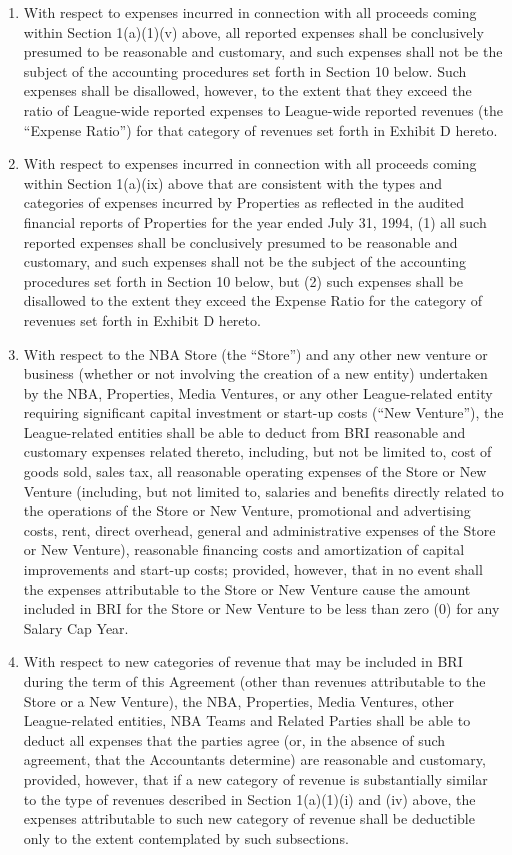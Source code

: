 \documentclass[
]{book}
\providecommand{\tightlist}{%
  \setlength{\itemsep}{0pt}\setlength{\parskip}{0pt}}
\begin{document}
\begin{enumerate}
\begin{enumerate}
    \begin{enumerate}
    \def\labelenumiii{(\roman{enumiii})}
    \tightlist
    \item
      With respect to expenses incurred in connection with all proceeds coming within Section 1(a)(1)(v) above, all reported expenses shall be conclusively presumed to be reasonable and customary, and such expenses shall not be the subject of the accounting procedures set forth in Section 10 below. Such expenses shall be disallowed, however, to the extent that they exceed the ratio of League-wide reported expenses to League-wide reported revenues (the ``Expense Ratio'') for that category of revenues set forth in Exhibit D hereto.
    \item
      With respect to expenses incurred in connection with all proceeds coming within Section 1(a)(ix) above that are consistent with the types and categories of expenses incurred by Properties as reflected in the audited financial reports of Properties for the year ended July 31, 1994, (1) all such reported expenses shall be conclusively presumed to be reasonable and customary, and such expenses shall not be the subject of the accounting procedures set forth in Section 10 below, but (2) such expenses shall be disallowed to the extent they exceed the Expense Ratio for the category of revenues set forth in Exhibit D hereto.
    \item
      With respect to the NBA Store (the ``Store'') and any other new venture or business (whether or not involving the creation of a new entity) undertaken by the NBA, Properties, Media Ventures, or any other League-related entity requiring significant capital investment or start-up costs (``New Venture''), the League-related entities shall be able to deduct from BRI reasonable and customary expenses related thereto, including, but not be limited to, cost of goods sold, sales tax, all reasonable operating expenses of the Store or New Venture (including, but not limited to, salaries and benefits directly related to the operations of the Store or New Venture, promotional and advertising costs, rent, direct overhead, general and administrative expenses of the Store or New Venture), reasonable financing costs and amortization of capital improvements and start-up costs; provided, however, that in no event shall the expenses attributable to the Store or New Venture cause the amount included in BRI for the Store or New Venture to be less than zero (0) for any Salary Cap Year.
    \item
      With respect to new categories of revenue that may be included in BRI during the term of this Agreement (other than revenues attributable to the Store or a New Venture), the NBA, Properties, Media Ventures, other League-related entities, NBA Teams and Related Parties shall be able to deduct all expenses that the parties agree (or, in the absence of such agreement, that the Accountants determine) are reasonable and customary, provided, however, that if a new category of revenue is substantially similar to the type of revenues described in Section 1(a)(1)(i) and (iv) above, the expenses attributable to such new category of revenue shall be deductible only to the extent contemplated by such subsections.

\end{enumerate}
\end{enumerate}
\end{enumerate}
\end{document}
